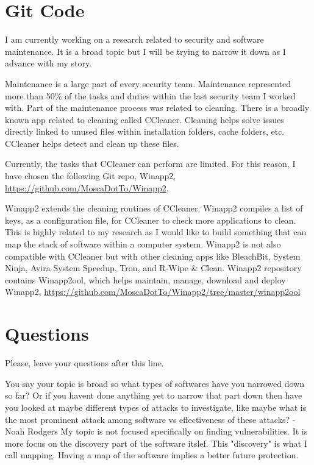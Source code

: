 \section{Git Code}
I am currently working on a research related to security and software maintenance. It is a broad topic but I will be trying to narrow it down as I advance with my story.

Maintenance is a large part of every security team. Maintenance represented more than 50\% of the tasks and duties within the last security team I worked with. Part of the maintenance process was related to cleaning. There is a broadly known app related to cleaning called CCleaner. Cleaning helps solve issues directly linked to unused files within installation folders, cache folders, etc. CCleaner helps detect and clean up these files.

Currently, the tasks that CCleaner can perform are limited. For this reason, I have chosen the following Git repo, Winapp2, \url{https://github.com/MoscaDotTo/Winapp2}.

Winapp2 extends the cleaning routines of CCleaner. Winapp2 compiles a list of keys, as a configuration file, for CCleaner to check more applications to clean.
This is highly related to my research as I would like to build something that can map the stack of software within a computer system.
Winapp2 is not also compatible with CCleaner but with other cleaning apps like BleachBit, System Ninja, Avira System Speedup, Tron, and R-Wipe \& Clean. Winapp2 repository contains Winapp2ool, which helps maintain, manage, download and deploy Winapp2, \url{https://github.com/MoscaDotTo/Winapp2/tree/master/winapp2ool}


\section{Questions}
Please, leave your questions after this line.

You say your topic is broad so what types of softwares have you narrowed down so far? Or if you havent done anything yet to narrow that part down then have you looked at maybe different types of attacks to investigate, like maybe what is the most prominent attack among software vs effectiveness of these attacks? -Noah Rodgers
My topic is not focused specifically on finding vulnerabilities. It is more focus on the discovery part of the software itslef. This "discovery" is what I call mapping. Having a map of the software implies a better future protection.




%
